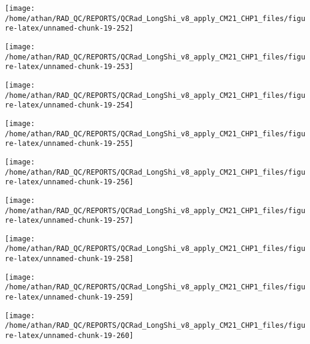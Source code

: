 \documentclass[
  10pt,
  a4paper,oneside]{article}
\begin{document}
\begin{center}\texttt{[image: /home/athan/RAD\_QC/REPORTS/QCRad\_LongShi\_v8\_apply\_CM21\_CHP1\_files/figure-latex/unnamed-chunk-19-252]} \end{center}

\begin{center}\texttt{[image: /home/athan/RAD\_QC/REPORTS/QCRad\_LongShi\_v8\_apply\_CM21\_CHP1\_files/figure-latex/unnamed-chunk-19-253]} \end{center}

\begin{center}\texttt{[image: /home/athan/RAD\_QC/REPORTS/QCRad\_LongShi\_v8\_apply\_CM21\_CHP1\_files/figure-latex/unnamed-chunk-19-254]} \end{center}

\begin{center}\texttt{[image: /home/athan/RAD\_QC/REPORTS/QCRad\_LongShi\_v8\_apply\_CM21\_CHP1\_files/figure-latex/unnamed-chunk-19-255]} \end{center}

\begin{center}\texttt{[image: /home/athan/RAD\_QC/REPORTS/QCRad\_LongShi\_v8\_apply\_CM21\_CHP1\_files/figure-latex/unnamed-chunk-19-256]} \end{center}

\begin{center}\texttt{[image: /home/athan/RAD\_QC/REPORTS/QCRad\_LongShi\_v8\_apply\_CM21\_CHP1\_files/figure-latex/unnamed-chunk-19-257]} \end{center}

\begin{center}\texttt{[image: /home/athan/RAD\_QC/REPORTS/QCRad\_LongShi\_v8\_apply\_CM21\_CHP1\_files/figure-latex/unnamed-chunk-19-258]} \end{center}

\begin{center}\texttt{[image: /home/athan/RAD\_QC/REPORTS/QCRad\_LongShi\_v8\_apply\_CM21\_CHP1\_files/figure-latex/unnamed-chunk-19-259]} \end{center}

\begin{center}\texttt{[image: /home/athan/RAD\_QC/REPORTS/QCRad\_LongShi\_v8\_apply\_CM21\_CHP1\_files/figure-latex/unnamed-chunk-19-260]} \end{center}
\end{document}
